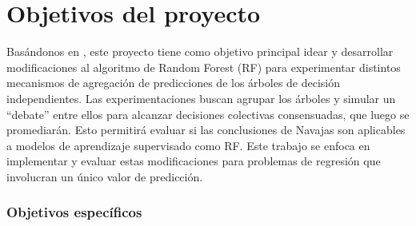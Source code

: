 %
\chapter{Objetivos del proyecto}
\label{ch::capitulo3}

Basándonos en \cite{navajasAggregatedKnowledge}, este proyecto tiene como objetivo principal idear y desarrollar modificaciones al algoritmo de Random Forest (RF) para experimentar distintos mecanismos de agregación de predicciones de los árboles de decisión independientes. Las experimentaciones buscan agrupar los árboles y simular un “debate” entre ellos para alcanzar decisiones colectivas consensuadas, que luego se promediarán. Esto permitirá evaluar si las conclusiones de Navajas son aplicables a modelos de aprendizaje supervisado como RF. Este trabajo se enfoca en implementar y evaluar estas modificaciones para problemas de regresión que involucran un único valor de predicción.

\subsection*{Objetivos específicos}

